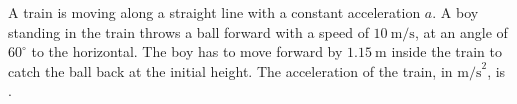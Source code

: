 
\item A train is moving along a straight line with a constant acceleration \(a\). A boy standing in the train throws a ball forward with a speed of \(10\ \text{m/s}\), at an angle of \(60^\circ\) to the horizontal. The boy has to move forward by \(1.15\ \text{m}\) inside the train to catch the ball back at the initial height. The acceleration of the train, in \(\text{m/s}^2\), is \underline{\hspace{2.5cm}}.

